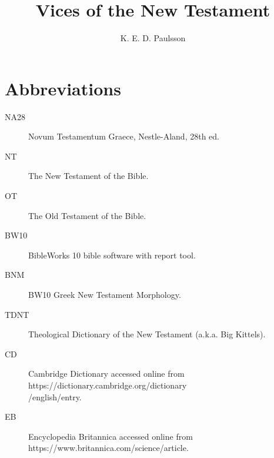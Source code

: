 \documentclass[a4paper,twocolumn,twoside,notitlepage,10pt]{article}
\title{Vices of the New Testament}
\author{K. E. D. Paulsson}
\begin{document}
\frenchspacing
\newcommand{\entlbl}[1]{\index[eng]{#1}\label{itm:#1}}
\newcommand{\entref}[1]{\emph{#1} ~($\rightarrow$~\pageref{itm:#1})}
\newcommand{\entrefgls}[1]{\emph{#1}$\rightarrow$\pageref{itm:#1}}
\newcommand{\grc}[1]{\greektext{#1}\latintext}
\newcommand{\cdfoot}[2]{\footnote{\emph{CD}, s.v. ``{#1},'' accessed \printdate{#2}.}}
\newcommand{\bkfoot}[3]{\footnote{{#3}, ``{#1},'' \emph{TDNT} {#2}.}}
\newcommand{\bksfoot}[2]{\footnote{{#2}, \emph{TDNT} {#1}.}}


\newcommand{\entgls}[1]{\gls{#1} \glsdesc{#1}}
\newcommand{\entglos}[1]{\\\textbf{\gls{#1}} \glsdesc{#1}}



\maketitle



\section{Abbreviations}
\begin{description}
    \item[NA28] Novum Testamentum Graece, Nestle-Aland, 28th ed.
	\item[NT] The New Testament of the Bible.
	\item[OT] The Old Testament of the Bible.
	\item[BW10] BibleWorks 10 bible software with report tool.
	\item[BNM] BW10 Greek New Testament Morphology.
	\item[TDNT] Theological Dictionary of the New Testament (a.k.a. Big Kittels).
	\item[CD] Cambridge Dictionary accessed online from https://dictionary.cambridge.org/dictionary\\/english/\textlangle entry\textrangle.
	\item[EB] Encyclopedia Britannica accessed online from https://www.britannica.com/science/\textlangle article\textrangle.
\end{description}


\end{document}
